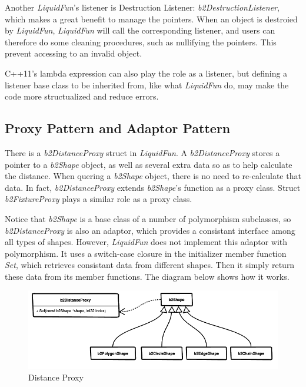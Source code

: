 \documentclass[UTF8]{ctexart}
\begin{document}
            Another \textit{LiquidFun}'s listener is Destruction Listener: \textit{b2DestructionListener}, which makes a great benefit to manage the pointers. When an object is destroied by \textit{LiquidFun}, \textit{LiquidFun} will call the corresponding listener, and users can therefore do some cleaning procedures, such as nullifying the pointers. This prevent accessing to an invalid object.

            C++11's lambda expression can also play the role as a listener, but defining a listener base class to be inherited from, like what \textit{LiquidFun} do, may make the code more structualized and reduce errors.

        \subsection{Proxy Pattern and Adaptor Pattern}
        
            There is a \textit{b2DistanceProxy} struct in \textit{LiquidFun}. A \textit{b2DistanceProxy} stores a pointer to a \textit{b2Shape} object, as well as several extra data so as to help calculate the distance. When quering a \textit{b2Shape} object, there is no need to re-calculate that data. In fact, \textit{b2DistanceProxy} extends \textit{b2Shape}'s function as a proxy class. Struct \textit{b2FixtureProxy} plays a similar role as a proxy class.
        
            Notice that \textit{b2Shape} is a base class of a number of polymorphism subclasses, so \textit{b2DistanceProxy} is also an adaptor, which provides a consistant interface among all types of shapes. However, \textit{LiquidFun} does not implement this adaptor with polymorphism. It uses a switch-case closure in the initializer member function \textit{Set}, which retrieves consistant data from different shapes. Then it simply return these data from its member functions. The diagram below shows how it works.

            \begin{figure}[ht]
                \centering
                \includegraphics[width=\textwidth]{distance_proxy.png}
                \caption{Distance Proxy}
            \end{figure}
\end{document}
